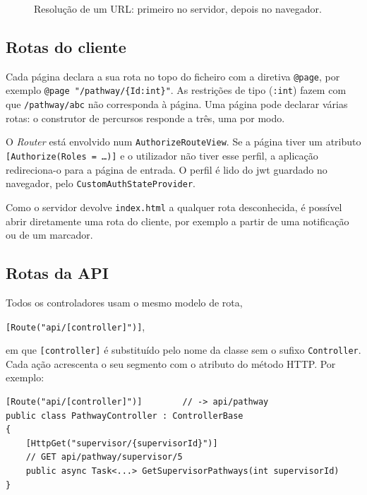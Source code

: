 \begin{figure}[H]
    \centering
    \resizebox{0.82\linewidth}{!}{}
    \caption{Resolução de um URL: primeiro no servidor, depois no navegador.}
    \label{fig:rotas}
\end{figure}

\subsection{Rotas do cliente}

Cada página declara a sua rota no topo do ficheiro com a diretiva \texttt{@page}, por exemplo \verb|@page "/pathway/{Id:int}"|. As restrições de tipo (\texttt{:int}) fazem com que \texttt{/pathway/abc} não corresponda à página. Uma página pode declarar várias rotas: o construtor de percursos responde a três, uma por modo.

O \emph{Router} está envolvido num \texttt{AuthorizeRouteView}. Se a página tiver um atributo \texttt{[Authorize(Roles = \ldots)]} e o utilizador não tiver esse perfil, a aplicação redireciona-o para a página de entrada. O perfil é lido do \gls{jwt} guardado no navegador, pelo \texttt{CustomAuthStateProvider}.

Como o servidor devolve \texttt{index.html} a qualquer rota desconhecida, é possível abrir diretamente uma rota do cliente, por exemplo a partir de uma notificação ou de um marcador.

\subsection{Rotas da API}

Todos os controladores usam o mesmo modelo de rota,

\begin{center}
\verb|[Route("api/[controller]")]|,
\end{center}

\noindent em que \texttt{[controller]} é substituído pelo nome da classe sem o sufixo \texttt{Controller}. Cada ação acrescenta o seu segmento com o atributo do método HTTP. Por exemplo:

\begin{lstlisting}[language={[Sharp]C}, basicstyle=\footnotesize\ttfamily, caption={Rota de uma ação em \texttt{PathwayController}.}, label={lst:rota}]
[Route("api/[controller]")]        // -> api/pathway
public class PathwayController : ControllerBase
{
    [HttpGet("supervisor/{supervisorId}")]
    // GET api/pathway/supervisor/5
    public async Task<...> GetSupervisorPathways(int supervisorId)
}
\end{lstlisting}

